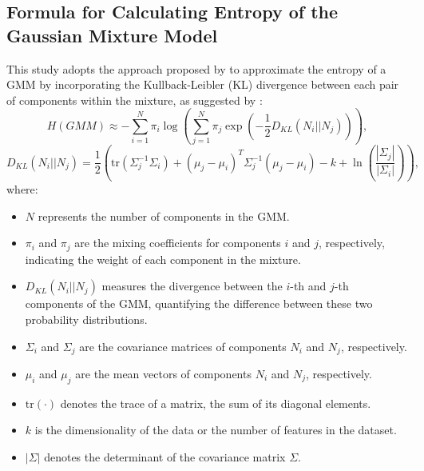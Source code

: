 \documentclass[../MA_Thesis.tex]{subfiles}
\begin{document}
\begin{appendix}
\section{Formula for Calculating Entropy of the Gaussian Mixture Model}
\label{appendix: entropy}
This study adopts the approach proposed by \textcite{huber_entropy_2008} to approximate the entropy of a GMM by incorporating the Kullback-Leibler (KL) divergence between each pair of components within the mixture, as suggested by \textcite{hershey_approximating_2007}:
\begin{equation*}
    H(GMM) \approx -\sum_{i=1}^{N} \pi_i \log \left(\sum_{j=1}^{N} \pi_j \exp\left(-\frac{1}{2} D_{KL}(N_i || N_j)\right)\right),
\end{equation*}
\begin{equation*}
    D_{KL}(N_i || N_j) = \frac{1}{2} \left( \text{tr}(\Sigma_j^{-1}\Sigma_i) + (\mu_j - \mu_i)^T \Sigma_j^{-1} (\mu_j - \mu_i) - k + \ln\left(\frac{|\Sigma_j|}{|\Sigma_i|}\right) \right),
\end{equation*}
where:
\begin{itemize}
    \item \(N\) represents the number of components in the GMM.
    \item \(\pi_i\) and \(\pi_j\) are the mixing coefficients for components \(i\) and \(j\), respectively, indicating the weight of each component in the mixture.
    \item \(D_{KL}(N_i || N_j)\) measures the divergence between the \(i\)-th and \(j\)-th components of the GMM, quantifying the difference between these two probability distributions.
    \item \(\Sigma_i\) and \(\Sigma_j\) are the covariance matrices of components \(N_i\) and \(N_j\), respectively.
    \item \(\mu_i\) and \(\mu_j\) are the mean vectors of components \(N_i\) and \(N_j\), respectively.
    \item \(\text{tr}(\cdot)\) denotes the trace of a matrix, the sum of its diagonal elements.
    \item \(k\) is the dimensionality of the data or the number of features in the dataset.
    \item \(|\Sigma|\) denotes the determinant of the covariance matrix \(\Sigma\).
\end{itemize}

\newpage

\end{appendix}
\end{document}
